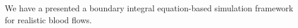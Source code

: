 
We have a presented a boundary integral equation-based simulation framework for realistic blood flows.
